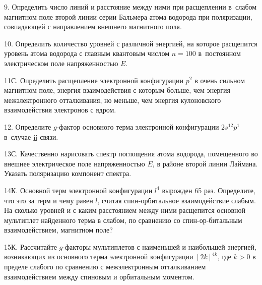 \par
9. Определить число линий и расстояние между ними при расщеплении в~слабом магнитном поле второй линии серии Бальмера атома водорода при поляризации, совпадающей с направлением внешнего магнитного поля.
\par
10. Определить количество уровней с различной энергией, на которое расщепится уровень атома водорода с главным квантовым числом $n = 100$ в~постоянном электрическом поле напряженностью $E$.
\par
11С. Определить расщепление электронной конфигурации $p^2$ в очень сильном магнитном поле, энергия взаимодействия с которым больше, чем энергия межэлектронного отталкивания, но меньше, чем энергия кулоновского взаимодействия электронов с ядром.
\par
12. Определите $g$-фактор основного терма электронной конфигурации $2s^12p^1$ в~случае jj связи.
\par
13С. Качественно нарисовать спектр поглощения атома водорода, помещенного во внешнее электрическое поле напряженностью $E$, в районе второй линии Лаймана. Указать поляризацию компонент спектра.
\par
14К. Основной терм электронной конфигурации $l^4$ вырожден 65 раз. Определите, что это за терм и чему равен $l$, считая спин-орбитальное взаимодействие слабым. На сколько уровней и с каким расстоянием между ними расщепится основной мультиплет найденного терма в слабом, по сравнению со спин-ор-битальным взаимодействием, магнитном поле?
\par
15К. Рассчитайте $g$-факторы мультиплетов с наименьшей и наибольшей энергией, возникающих из основного терма электронной конфигурации $[2k]^{4k}$, где $k>0$ в пределе слабого по сравнению с межэлектронным отталкиванием взаимодействием между спиновым и орбитальным моментом.
\par
